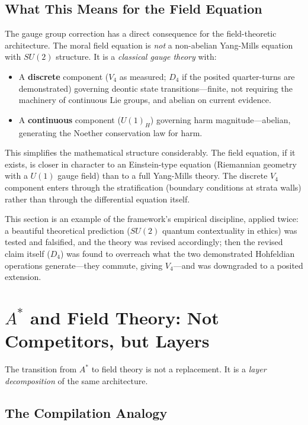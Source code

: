 \documentclass[12pt,letterpaper]{article}
\theoremstyle{definition}
\begin{document}
\subsection{What This Means for the Field Equation}

The gauge group correction has a direct consequence for the field-theoretic architecture. The moral field equation is \emph{not} a non-abelian Yang-Mills equation with $SU(2)$ structure. It is a \emph{classical gauge theory} with:

\begin{itemize}
    \item A \textbf{discrete} component ($V_4$ as measured; $D_4$ if the posited quarter-turns are demonstrated) governing deontic state transitions---finite, not requiring the machinery of continuous Lie groups, and abelian on current evidence.
    \item A \textbf{continuous} component ($U(1)_H$) governing harm magnitude---abelian, generating the Noether conservation law for harm.
\end{itemize}

This simplifies the mathematical structure considerably. The field equation, if it exists, is closer in character to an Einstein-type equation (Riemannian geometry with a $U(1)$ gauge field) than to a full Yang-Mills theory. The discrete $V_4$ component enters through the stratification (boundary conditions at strata walls) rather than through the differential equation itself.

This section is an example of the framework's empirical discipline, applied twice: a beautiful theoretical prediction ($SU(2)$ quantum contextuality in ethics) was tested and falsified, and the theory was revised accordingly; then the revised claim itself ($D_4$) was found to overreach what the two demonstrated Hohfeldian operations generate---they commute, giving $V_4$---and was downgraded to a posited extension.


\section{$A^*$ and Field Theory: Not Competitors, but Layers}
\label{sec:layers}

The transition from $A^*$ to field theory is not a replacement. It is a \emph{layer decomposition} of the same architecture.

\subsection{The Compilation Analogy}
\end{document}
